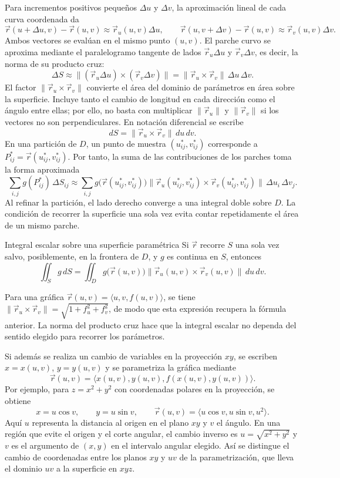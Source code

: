 Para incrementos positivos pequeños $\Delta u$ y $\Delta v$, la aproximación lineal de cada curva coordenada da
\[
\vec r(u+\Delta u,v)-\vec r(u,v)\approx\vec r_u(u,v)\Delta u,
\qquad
\vec r(u,v+\Delta v)-\vec r(u,v)\approx\vec r_v(u,v)\Delta v.
\]
Ambos vectores se evalúan en el mismo punto $(u,v)$. El parche curvo se aproxima mediante el paralelogramo tangente de lados $\vec r_u\Delta u$ y $\vec r_v\Delta v$, es decir, la norma de su producto cruz:
\[
\Delta S\approx
\bigl\lVert(\vec r_u\Delta u)\times(\vec r_v\Delta v)\bigr\rVert
=\lVert\vec r_u\times\vec r_v\rVert\,\Delta u\,\Delta v.
\]
El factor $\lVert\vec r_u\times\vec r_v\rVert$ convierte el área del dominio de parámetros en área sobre la superficie. Incluye tanto el cambio de longitud en cada dirección como el ángulo entre ellas; por ello, no basta con multiplicar $\lVert\vec r_u\rVert$ y $\lVert\vec r_v\rVert$ si los vectores no son perpendiculares. En notación diferencial se escribe
\[
dS=\lVert\vec r_u\times\vec r_v\rVert\,du\,dv.
\]
En una partición de $D$, un punto de muestra $(u_{ij}^{*},v_{ij}^{*})$ corresponde a $P_{ij}^{*}=\vec r(u_{ij}^{*},v_{ij}^{*})$. Por tanto, la suma de las contribuciones de los parches toma la forma aproximada
\[
\sum_{i,j}g(P_{ij}^{*})\,\Delta S_{ij}
\approx\sum_{i,j}
g\bigl(\vec r(u_{ij}^{*},v_{ij}^{*})\bigr)
\lVert\vec r_u(u_{ij}^{*},v_{ij}^{*})\times
\vec r_v(u_{ij}^{*},v_{ij}^{*})\rVert\,\Delta u_i\,\Delta v_j.
\]
Al refinar la partición, el lado derecho converge a una integral doble sobre $D$. La condición de recorrer la superficie una sola vez evita contar repetidamente el área de un mismo parche.

\begin{mytheorem}{Integral escalar sobre una superficie paramétrica}
Si $\vec r$ recorre $S$ una sola vez salvo, posiblemente, en la frontera de $D$, y $g$ es continua en $S$, entonces
\[
\iint_S g\,dS
=\iint_D g\bigl(\vec r(u,v)\bigr)
\lVert\vec r_u(u,v)\times\vec r_v(u,v)\rVert\,du\,dv.
\]
\end{mytheorem}

Para una gráfica $\vec r(u,v)=\langle u,v,f(u,v)\rangle$, se tiene $\lVert\vec r_u\times\vec r_v\rVert=\sqrt{1+f_u^2+f_v^2}$, de modo que esta expresión recupera la fórmula anterior. La norma del producto cruz hace que la integral escalar no dependa del sentido elegido para recorrer los parámetros.

Si además se realiza un cambio de variables en la proyección $xy$, se escriben $x=x(u,v)$, $y=y(u,v)$ y se parametriza la gráfica mediante
\[
\vec r(u,v)=\langle x(u,v),y(u,v),f(x(u,v),y(u,v))\rangle.
\]
Por ejemplo, para $z=x^2+y^2$ con coordenadas polares en la proyección, se obtiene
\[
x=u\cos v,\qquad y=u\sin v,\qquad
\vec r(u,v)=\langle u\cos v,u\sin v,u^2\rangle.
\]
Aquí $u$ representa la distancia al origen en el plano $xy$ y $v$ el ángulo. En una región que evite el origen y el corte angular, el cambio inverso es $u=\sqrt{x^2+y^2}$ y $v$ es el argumento de $(x,y)$ en el intervalo angular elegido. Así se distingue el cambio de coordenadas entre los planos $xy$ y $uv$ de la parametrización, que lleva el dominio $uv$ a la superficie en $xyz$.

